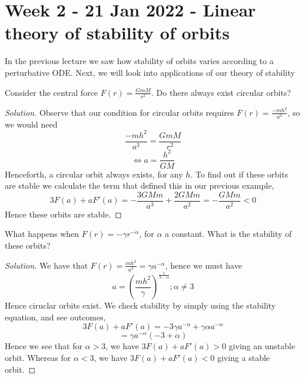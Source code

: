 \section{Week 2 - 21 Jan 2022 - Linear theory of stability of orbits}
In the previous lecture we saw how stability of orbits varies according to a
perturbative ODE. Next, we will look into applications of our theory of
stability
\begin{example}
  Consider the central force $F(r)=\frac{GmM}{r^2}$. Do there always exist
  circular orbits?
\end{example}
\begin{proof}[Solution]
  Observe that our condition for circular orbits requires
  $F(r)=\frac{-mh^2}{a^3}$, so we would need 
  \[\frac{-mh^2}{a^3} = \frac{Gm M}{r^2}\]
  \[\iff a= \frac{h^2}{GM}\]
  Henceforth, a circular orbit always exists, for any $h$. To find out if these
  orbits are stable we calculate the term that defined this in our previous
  example,
  \[3F(a)+aF'(a) = -\frac{3GMm}{a^3} + \frac{2GMm}{a^2} = -\frac{GMm}{a^2}<0\]
  Hence these orbits are stable.
\end{proof}

\begin{example}
  What happens when $F(r)=-\gamma r^{-\alpha}$, for $\alpha$ a constant. What is
  the stability of these orbits?
\end{example}
\begin{proof}[Solution]
  We have that $F(r)=\frac{mh^2}{a^3}=\gamma a^{-\alpha}$, hence we must have 
  \[a=\left( \frac{mh^2}{\gamma} \right)^{\frac{1}{3-\alpha}} ; \alpha\neq 3\]
  Hence ciruclar orbits exist. We check stability by simply using the stability
  equation, and see outcomes,
  \[3F(a)+ aF'(a)=-3\gamma a^{-\alpha} + \gamma\alpha a^{-\alpha}\]
  \[= \gamma a^{-\alpha} (-3+\alpha)\]
  Hence we see that for $\alpha>3$, we have $3F(a)+ aF'(a)>0$ giving an unstable
  orbit. Whereas for $\alpha<3$, we have $3F(a)+ aF'(a)<0$ giving a stable
  orbit.
\end{proof}

